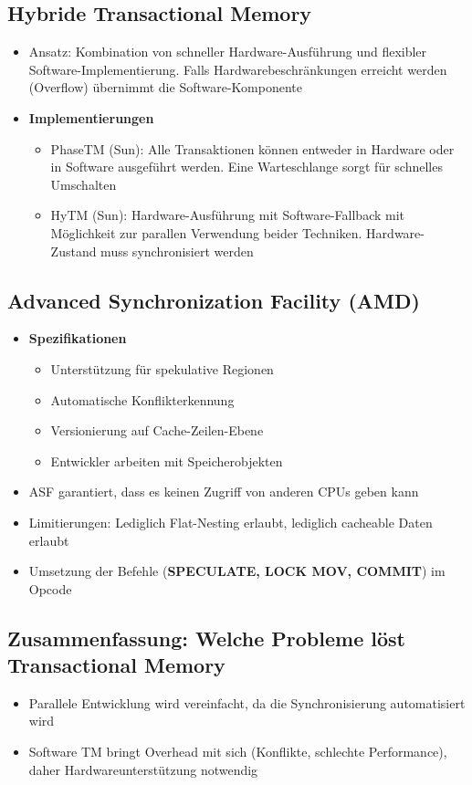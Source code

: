\subsection{Hybride Transactional Memory}
\begin{itemize}
	\item Ansatz: Kombination von schneller Hardware-Ausführung und flexibler Software-Implementierung. Falls Hardwarebeschränkungen erreicht werden (Overflow) übernimmt die Software-Komponente
	\item \textbf{Implementierungen}
	\begin{itemize}
		\item PhaseTM (Sun): Alle Transaktionen können entweder in Hardware oder in Software ausgeführt werden. Eine Warteschlange sorgt für schnelles Umschalten
		\item HyTM (Sun): Hardware-Ausführung mit Software-Fallback mit Möglichkeit zur parallen Verwendung beider Techniken. Hardware-Zustand muss synchronisiert werden
	\end{itemize}
\end{itemize}


\subsection{Advanced Synchronization Facility (AMD)}
\begin{itemize}
	\item \textbf{Spezifikationen}
	\begin{itemize}
		\item Unterstützung für spekulative Regionen
		\item Automatische Konflikterkennung
		\item Versionierung auf Cache-Zeilen-Ebene
		\item Entwickler arbeiten mit Speicherobjekten
	\end{itemize}
	\item ASF garantiert, dass es keinen Zugriff von anderen CPUs geben kann
	\item Limitierungen: Lediglich Flat-Nesting erlaubt, lediglich cacheable Daten erlaubt %
	\item Umsetzung der Befehle (\textbf{SPECULATE, LOCK MOV, COMMIT}) im Opcode
\end{itemize}


\subsection{Zusammenfassung: Welche Probleme löst Transactional Memory}
\begin{itemize}
	\item Parallele Entwicklung wird vereinfacht, da die Synchronisierung automatisiert wird
	\item Software TM bringt Overhead mit sich (Konflikte, schlechte Performance), daher Hardwareunterstützung notwendig
\end{itemize}
